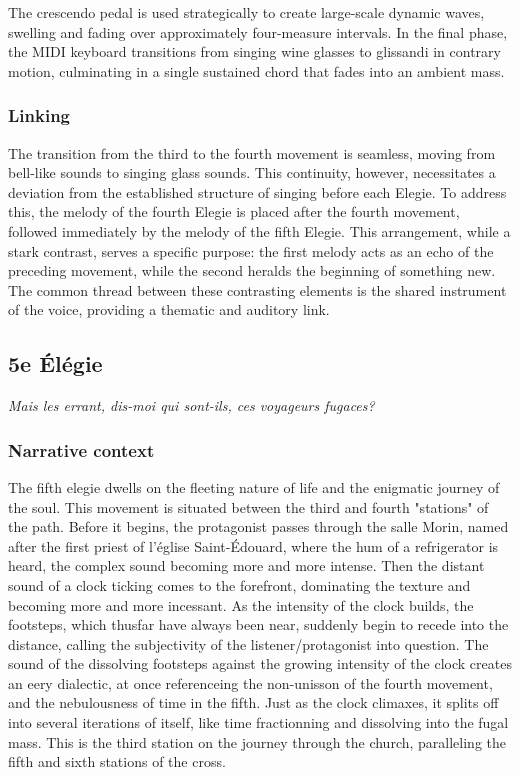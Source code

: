 \documentclass[12pt,twoside,maitrise]{dms}
\theoremstyle{definition}
\begin{document}
The crescendo pedal is used strategically to create large-scale dynamic waves, swelling and fading over approximately four-measure intervals.
In the final phase, the MIDI keyboard transitions from singing wine glasses to glissandi in contrary motion, culminating in a single sustained chord that fades into an ambient mass.


\subsubsection{Linking}

The transition from the third to the fourth movement is seamless, moving from bell-like sounds to singing glass sounds.
This continuity, however, necessitates a deviation from the established structure of singing before each Elegie.
To address this, the melody of the fourth Elegie is placed after the fourth movement, followed immediately by the melody of the fifth Elegie.
This arrangement, while a stark contrast, serves a specific purpose: the first melody acts as an echo of the preceding movement, while the second heralds the beginning of something new.
The common thread between these contrasting elements is the shared instrument of the voice, providing a thematic and auditory link.

\subsection{5e Élégie}

\epigraph{\textit{Mais les errant, dis-moi qui sont-ils, ces voyageurs fugaces?}}{}

\subsubsection{Narrative context}

The fifth elegie dwells on the fleeting nature of life and the enigmatic journey of the soul.
This movement is situated between the third and fourth "stations" of the path.
Before it begins, the protagonist passes through the salle Morin, named after the first priest of l'église Saint-Édouard, where the hum of a refrigerator is heard, the complex sound becoming more and more intense.
Then the distant sound of a clock ticking comes to the forefront, dominating the texture and becoming more and more incessant.
As the intensity of the clock builds, the footsteps, which thusfar have always been near, suddenly begin to recede into the distance, calling the subjectivity of the listener/protagonist into question.
The sound of the dissolving footsteps against the growing intensity of the clock creates an eery dialectic, at once referenceing the non-unisson of the fourth movement, and the nebulousness of time in the fifth.
Just as the clock climaxes, it splits off into several iterations of itself, like time fractionning and dissolving into the fugal mass.
This is the third station on the journey through the church, paralleling the fifth and sixth stations of the cross.
\end{document}
